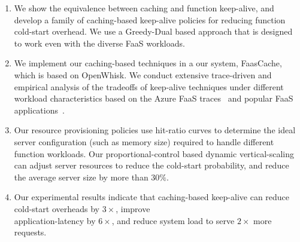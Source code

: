 \begin{enumerate}
\item We show the equivalence between caching and function keep-alive, and develop a family of caching-based keep-alive policies for reducing  function cold-start overhead. We use a Greedy-Dual based approach that is designed to work even with the diverse FaaS workloads. 

\item We implement our caching-based techniques in a our system, FaasCache, which is based on OpenWhisk. 
  We conduct extensive trace-driven and empirical analysis of the tradeoffs of keep-alive techniques under different workload characteristics based on the Azure FaaS traces~\cite{shahrad_serverless_2020} and popular FaaS applications~\cite{kim_functionbench_2019}.
  
 
\item Our resource provisioning policies use hit-ratio curves to determine the ideal server configuration (such as memory size) required to handle different function workloads.
  Our proportional-control based dynamic vertical-scaling  can adjust server resources to reduce the cold-start probability, and reduce the average server size by more than $30\%$. 

\item   Our experimental results indicate that caching-based keep-alive can reduce cold-start overheads by $3\times$, 
  improve \\ application-latency by $6\times$,
  and reduce system load to serve $2\times$ more requests.
\end{enumerate}

%
%









